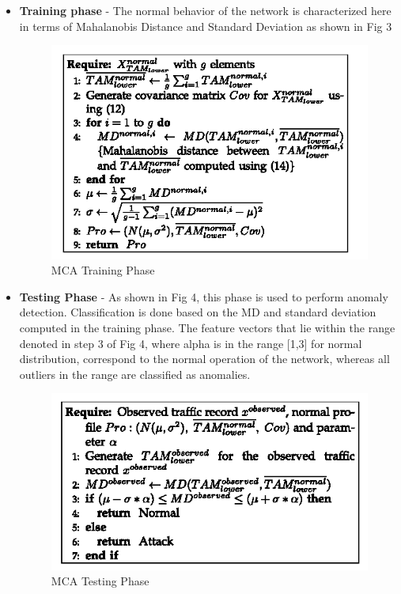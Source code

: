 \documentclass[conference]{sig-alternate-05-2015}
\begin{document}
\begin{itemize}
\begin{itemize}
  \item \textbf{Training phase} - The normal behavior of the network is characterized here in terms of Mahalanobis Distance and Standard Deviation as shown in Fig 3
  \begin{figure}[H]
\caption{MCA Training Phase \cite{MCA}} 
\includegraphics[width=\columnwidth]{mcatrain}
\centering
\end{figure}
  \item \textbf{Testing Phase} - As shown in Fig 4, this phase is used to perform anomaly detection. Classification is done based on the MD and standard deviation computed in the training phase. The feature vectors that lie within the range denoted in step 3 of Fig 4, where alpha is in the range [1,3] for normal distribution, correspond to the normal operation of the network, whereas all outliers in the range are classified as anomalies.
   \begin{figure}[H]
\caption{MCA Testing Phase \cite{MCA}}
\includegraphics[width=\columnwidth]{mcatst}
\centering
\end{figure}
\end{itemize}




\end{itemize}
\end{document}
